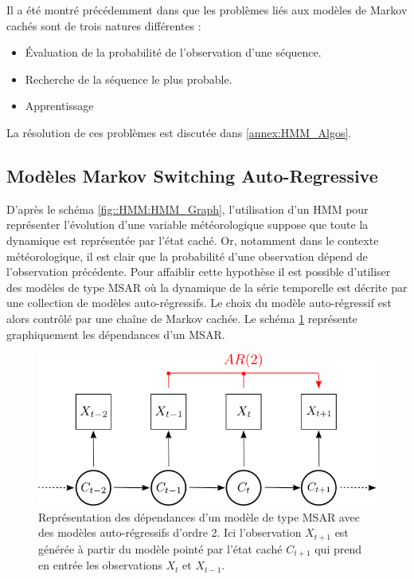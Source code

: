 \documentclass[12pt]{report}
\begin{document}
Il a été montré précédemment dans \cite{rabiner_tutorial_1989} que les problèmes liés aux modèles de Markov cachés sont de trois natures différentes : 
\begin{itemize}
	\item Évaluation de la probabilité de l’observation d’une séquence.
	\item Recherche de la séquence le plus probable.
	\item Apprentissage
\end{itemize}

La résolution de ces problèmes est discutée dans \ref{annex:HMM_Algos}.


\subsection{Modèles Markov Switching Auto-Regressive}
\label{subsec:Modeles_MSAR}
D'après le schéma \ref{fig::HMM:HMM_Graph}, l'utilisation d'un HMM pour représenter l'évolution d'une variable météorologique suppose que toute la dynamique est représentée par l'état caché. Or, notamment dans le contexte météorologique, il est clair que la probabilité d'une observation dépend de l'observation précédente. Pour affaiblir cette hypothèse il est possible d'utiliser des modèles de type MSAR où la dynamique de la série temporelle est décrite par une collection de modèles auto-régressifs. Le choix du modèle auto-régressif est alors contrôlé par une chaîne de Markov cachée. Le schéma \ref{fig::HMM:MSAR} représente graphiquement les dépendances d'un MSAR.

\begin{figure}[ht]
	\begin{center}
		\includegraphics[width=0.6 \textwidth]{Images/Models/HMM/MSAR.png}
		\caption{Représentation des dépendances d'un modèle de type MSAR avec des modèles auto-régressifs d'ordre 2. Ici l'observation $X_{t+1}$ est générée à partir du modèle pointé par l'état caché $C_{t+1}$ qui prend en entrée les observations $X_t$ et $X_{t-1}$.}
		\label{fig::HMM:MSAR}
	\end{center}
\end{figure}
\end{document}
